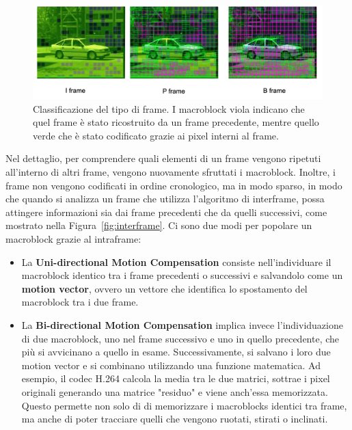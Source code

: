 \documentclass[a4paper,12pt, oneside]{article}
\begin{document}
\begin{figure}[h]
    \centering
    \includegraphics[width=1\textwidth]{images/frame-type.png}
    \caption{Classificazione del tipo di frame.
    I macroblock viola indicano che quel frame è stato ricostruito da un frame precedente,
    mentre quello verde che è stato codificato grazie ai pixel interni al frame.}
    \label{fig:frame_type}
\end{figure}

Nel dettaglio, per comprendere quali elementi di un frame vengono ripetuti all'interno di altri frame,
vengono nuovamente sfruttati i macroblock. Inoltre, i frame non vengono codificati in ordine cronologico,
ma in modo sparso, in modo che quando si analizza un frame che utilizza l'algoritmo di interframe, possa
attingere informazioni sia dai frame precedenti che da quelli successivi, come mostrato nella
Figura~\ref{fig:interframe}. Ci sono due modi per popolare un macroblock grazie al intraframe:

\begin{itemize}
  \item La \textbf{Uni-directional Motion Compensation} consiste nell'individuare il macroblock identico
  tra i frame precedenti o successivi e salvandolo come un \textbf{motion vector}, ovvero un vettore che
  identifica lo spostamento del macroblock tra i due frame.
  \item La \textbf{Bi-directional Motion Compensation} implica invece l'individuazione di due macroblock,
  uno nel frame successivo e uno in quello precedente, che più si avvicinano a quello in esame.
  Successivamente, si salvano i loro due motion vector e si combinano utilizzando una funzione matematica.
  Ad esempio, il codec H.264 calcola la media tra le due matrici, sottrae i pixel originali generando una
  matrice "residuo" e viene anch'essa memorizzata. Questo permette non solo di di memorizzare i
  macroblocks identici tra frame, ma anche di poter tracciare quelli che vengono ruotati, stirati o inclinati.
\end{itemize}
\end{document}
